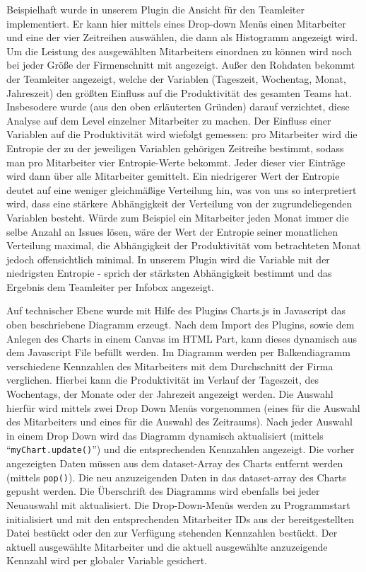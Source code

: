 \documentclass[a4paper,12pt,]{article}
\begin{document}
Beispielhaft wurde in unserem Plugin die Ansicht für den Teamleiter implementiert. Er kann hier mittels eines Drop-down Menüs einen Mitarbeiter und eine der vier Zeitreihen auswählen, die dann als Histogramm angezeigt wird. Um die Leistung des ausgewählten Mitarbeiters einordnen zu können wird noch bei jeder Größe der Firmenschnitt mit angezeigt. Außer den Rohdaten bekommt der Teamleiter angezeigt, welche der Variablen (Tageszeit, Wochentag, Monat, Jahreszeit) den größten Einfluss auf die Produktivität des gesamten Teams hat. Insbesodere wurde (aus den oben erläuterten Gründen) darauf verzichtet, diese Analyse auf dem Level einzelner Mitarbeiter zu machen. Der Einfluss einer Variablen auf die Produktivität wird wiefolgt gemessen: pro Mitarbeiter wird die Entropie der zu der jeweiligen Variablen gehörigen Zeitreihe bestimmt, sodass man pro Mitarbeiter vier Entropie-Werte bekommt. Jeder dieser vier Einträge wird dann über alle Mitarbeiter gemittelt. Ein niedrigerer Wert der Entropie deutet auf eine weniger gleichmäßige Verteilung hin, was von uns so interpretiert wird, dass eine stärkere Abhängigkeit der Verteilung von der zugrundeliegenden Variablen besteht. Würde zum Beispiel ein Mitarbeiter jeden Monat immer die selbe Anzahl an Issues lösen, wäre der Wert der Entropie seiner monatlichen Verteilung maximal, die Abhängigkeit der Produktivität vom betrachteten Monat jedoch offensichtlich minimal. In unserem Plugin wird die Variable mit der niedrigsten Entropie - sprich der stärksten Abhängigkeit bestimmt und das Ergebnis dem Teamleiter per Infobox angezeigt.


Auf technischer Ebene wurde mit Hilfe des Plugins Charts.js in Javascript das oben beschriebene Diagramm erzeugt.
Nach dem Import des Plugins, sowie dem Anlegen des Charts in einem Canvas im HTML Part, kann dieses dynamisch aus dem Javascript File befüllt werden.
Im Diagramm werden per Balkendiagramm verschiedene Kennzahlen des Mitarbeiters mit dem Durchschnitt der Firma verglichen. Hierbei kann die Produktivität im Verlauf der Tageszeit, des Wochentags, der Monate oder der Jahrezeit angezeigt werden. Die Auswahl hierfür wird mittels zwei Drop Down Menüs vorgenommen (eines für die Auswahl des Mitarbeiters und eines für die Auswahl des Zeitraums). Nach jeder Auswahl in einem Drop Down wird das Diagramm dynamisch aktualisiert (mittels ``{\tt myChart.update()}'') und die entsprechenden Kennzahlen angezeigt.
Die vorher angezeigten Daten müssen aus dem dataset-Array des Charts entfernt werden (mittels {\tt pop()}). Die neu anzuzeigenden Daten in das dataset-array des Charts gepusht werden. Die Überschrift des Diagramms wird ebenfalls bei jeder Neuauswahl mit aktualisiert.
Die Drop-Down-Menüs werden zu Programmstart initialisiert und mit den entsprechenden Mitarbeiter IDs aus der bereitgestellten Datei bestückt oder den zur Verfügung stehenden Kennzahlen bestückt. Der aktuell ausgewählte Mitarbeiter und die aktuell ausgewählte anzuzeigende Kennzahl wird per globaler Variable gesichert.
\end{document}

